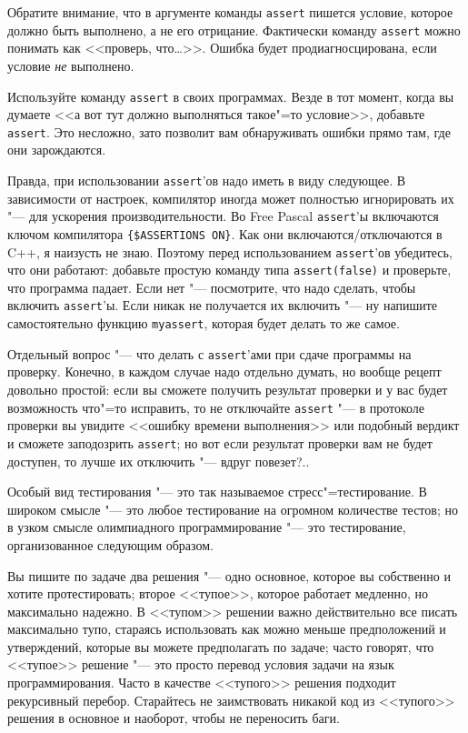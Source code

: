 \documentclass[a4paper,10pt]{problems}
\begin{document}
Обратите внимание, что в аргументе команды \verb`assert` пишется условие, которое должно быть выполнено, а не его отрицание. 
Фактически команду \verb`assert` можно понимать как <<проверь, что\dots>>. Ошибка будет продиагносцирована, если условие \textit{не} выполнено.

Используйте команду \verb`assert` в своих программах. 
Везде в тот момент, когда вы думаете <<а вот тут должно выполняться такое"=то условие>>, добавьте \verb`assert`. 
Это несложно, зато позволит вам обнаруживать ошибки прямо там, где они зарождаются.

Правда, при использовании \verb`assert`'ов надо иметь в виду следующее.
В зависимости от настроек, компилятор иногда может полностью игнорировать их "--- для ускорения производительности.
Во Free Pascal \verb`assert`'ы включаются ключом компилятора \verb`{$ASSERTIONS ON}`. 
Как они включаются/отключаются в C++, я наизусть не знаю.
Поэтому перед использованием \verb`assert`'ов убедитесь, что они работают: добавьте простую команду типа \verb`assert(false)` и проверьте,
что программа падает. 
Если нет "--- посмотрите, что надо сделать, чтобы включить \verb`assert`'ы. 
Если никак не получается их включить "--- ну напишите самостоятельно функцию \verb`myassert`, которая будет делать то же самое.

Отдельный вопрос "--- что делать с \verb`assert`'ами при сдаче программы на проверку. 
Конечно, в каждом случае надо отдельно думать, но вообще рецепт довольно простой: если вы сможете получить результат проверки и у вас будет возможность
что"=то исправить, то не отключайте \verb`assert` "--- в протоколе проверки вы увидите <<ошибку времени выполнения>> или подобный вердикт и
сможете заподозрить \verb`assert`; но вот если результат проверки вам не будет доступен, то лучше их отключить "--- вдруг повезет?..

Особый вид тестирования "--- это так называемое стресс"=тестирование. В широком смысле "--- это любое тестирование на огромном количестве тестов; но в узком смысле олимпиадного программирование "--- это тестирование, организованное следующим образом.

Вы пишите по задаче два решения "--- одно основное, которое вы собственно и хотите протестировать; второе <<тупое>>, которое работает медленно, но максимально надежно. 
В <<тупом>> решении важно действительно все писать максимально тупо, стараясь использовать как можно меньше предположений и утверждений, 
которые вы можете предполагать по задаче; часто говорят, что <<тупое>> решение "--- это просто перевод условия задачи на язык программирования.
Часто в качестве <<тупого>> решения подходит рекурсивный перебор. 
Старайтесь не заимствовать никакой код из <<тупого>> решения в основное и наоборот, чтобы не переносить баги.
\end{document}
